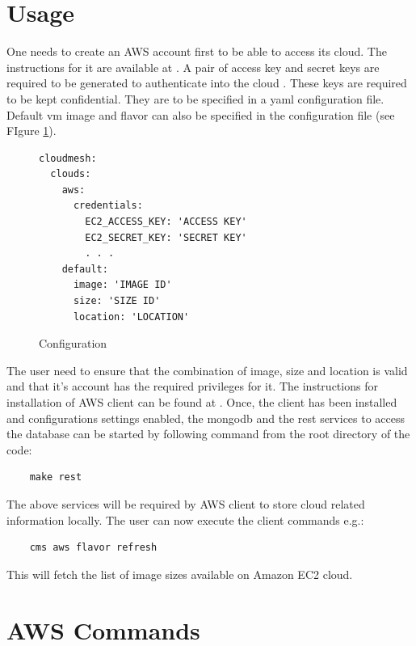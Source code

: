 \documentclass[9pt,twocolumn,twoside]{../../styles/osajnl}
\begin{document}
\begin{description}
\end{description}

\section{Usage}

One needs to create an AWS account first to be able to access its
cloud. The instructions for it are available at
\cite{www-amazon-aws}. A pair of access key and secret keys are
required to be generated to authenticate into the cloud
\cite{www-amazon-key}. These keys are required to be kept
confidential. They are to be specified in a yaml configuration
file. Default vm image and flavor can also be specified in the
configuration file (see FIgure \ref{F:conf}). 

\begin{figure}[htb]
\begin{verbatim} 
cloudmesh:
  clouds:
    aws:
      credentials:
        EC2_ACCESS_KEY: 'ACCESS KEY'
        EC2_SECRET_KEY: 'SECRET KEY'
        . . .
    default:
      image: 'IMAGE ID'
      size: 'SIZE ID'
      location: 'LOCATION'
\end{verbatim}
\vspace{-1.0\baselineskip}
\caption{Configuration}\label{F:conf}
\end{figure}

The user need to ensure that the combination of image, size and
location is valid and that it's account has the required privileges
for it. The instructions for installation of AWS client can be found
at \cite{www-cloudmesh-aws}. Once, the client has been installed and
configurations settings enabled, the mongodb and the rest services to
access the database can be started by following command from the root
directory of the code:

\begin{verbatim}
    make rest
\end{verbatim}

The above services will be required by AWS client to store cloud
related information locally. The user can now execute the client
commands e.g.:

\begin{verbatim}
    cms aws flavor refresh
\end{verbatim}

This will fetch the list of image sizes available on Amazon EC2 cloud.

\section{AWS Commands}
\end{document}

